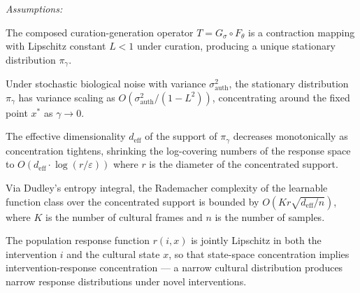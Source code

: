 \documentclass[11pt, a4paper]{article}
\theoremstyle{remark}
\begin{document}
\emph{Assumptions:}

\begin{description}[style=nextline, font=\normalfont\itshape]
\item[(A1) Contraction.] The composed curation-generation operator $T = G_\sigma \circ F_\theta$ is a contraction mapping with Lipschitz constant $L < 1$ under curation, producing a unique stationary distribution $\pi_\gamma$.
\item[(A2) Noise-Concentration.] Under stochastic biological noise with variance $\sigma_{\text{auth}}^2$, the stationary distribution $\pi_\gamma$ has variance scaling as $O(\sigma_{\text{auth}}^2 / (1 - L^2))$, concentrating around the fixed point $x^*$ as $\gamma \to 0$.
\item[(A3) Dimensional Collapse.] The effective dimensionality $d_{\text{eff}}$ of the support of $\pi_\gamma$ decreases monotonically as concentration tightens, shrinking the log-covering numbers of the response space to $O(d_{\text{eff}} \cdot \log(r/\varepsilon))$ where $r$ is the diameter of the concentrated support.
\item[(A4) Complexity Bound.] Via Dudley's entropy integral, the Rademacher complexity of the learnable function class over the concentrated support is bounded by $O(Kr\sqrt{d_{\text{eff}}/n})$, where $K$ is the number of cultural frames and $n$ is the number of samples.
\item[(A5) Intervention Regularity.] The population response function $r(i, x)$ is jointly Lipschitz in both the intervention $i$ and the cultural state $x$, so that state-space concentration implies intervention-response concentration --- a narrow cultural distribution produces narrow response distributions under novel interventions.
\end{description}
\end{document}
